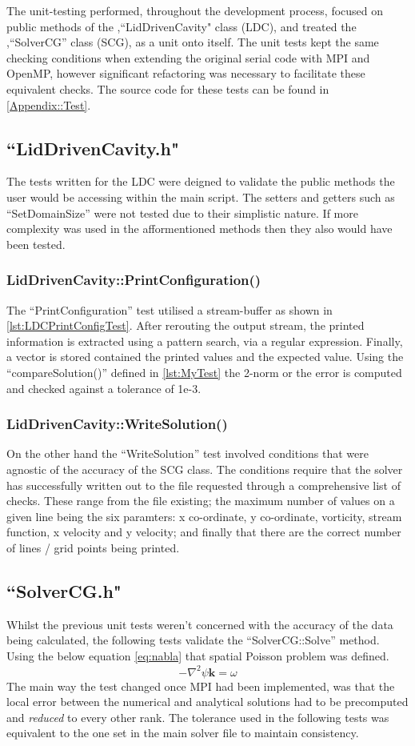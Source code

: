 The unit-testing performed, throughout the development process, 
focused on public methods of the ,``LidDrivenCavity" class (LDC), and treated the ,``SolverCG'' class (SCG),
as a unit onto itself. The unit tests kept the same checking conditions when extending the original
serial code with MPI and OpenMP, however significant refactoring was necessary to facilitate these equivalent checks.
The source code for these tests can be found in \app\ref{Appendix::Test}.
\subsection{``LidDrivenCavity.h"}
The tests written for the LDC were deigned to validate the public methods the user would be accessing within the main script.
The setters and getters such as ``SetDomainSize'' were not tested due to their simplistic nature.
If more complexity was used in the afformentioned methods then they also would have been tested. 
\subsubsection{LidDrivenCavity::PrintConfiguration()}
The ``PrintConfiguration'' test utilised a stream-buffer as shown in \code\ref{lst:LDCPrintConfigTest}. After rerouting the output stream, the printed information
is extracted using a pattern search, via a regular expression. Finally, a vector is stored contained the printed values and the expected value.
Using the ``compareSolution()'' defined in \code\ref{lst:MyTest} the 2-norm or the error is computed and checked against a tolerance of 1e-3.
\subsubsection{LidDrivenCavity::WriteSolution()}
On the other hand the ``WriteSolution'' test involved conditions that were  agnostic of the accuracy of the SCG class.
The conditions require that the solver has successfully written out to the file requested through a comprehensive list of checks. 
These range from the file existing; the maximum number of values on a given line being the six paramters: 
x co-ordinate, y co-ordinate, vorticity, stream function, x velocity and y velocity;
and finally that there are the correct number of lines / grid points being printed.
\subsection{``SolverCG.h"}
Whilst the previous unit tests weren't concerned with the accuracy of the data being calculated, the following tests validate the ``SolverCG::Solve'' method.
Using the below equation \eq\ref{eq:nabla} that spatial Poisson problem was defined. 
\begin{equation}
    - {\nabla}^2 \psi \hat{\mathbf{k}} = \omega
    \label{eq:nabla}
\end{equation}
The main way the test changed once MPI had been implemented, was that the local error between the numerical and analytical solutions had to be precomputed and {\it reduced} to every other rank.
The tolerance used in the following tests was equivalent to the one set in the main solver file to maintain consistency.
